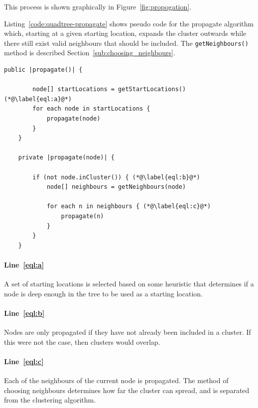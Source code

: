 This process is shown graphically in Figure~\ref{fig:propogation}.

Listing~\ref{code:quadtree-propagate} shows pseudo code for the propagate
algorithm which, starting at a given starting location, expands the cluster
outwards while there still exist valid neighbours that should be included. The
\texttt{getNeighbours()} method is described
Section~\ref{sub:choosing_neighbours}.

\begin{center}
\begin{minipage}{\textwidth}
\begin{lstlisting}[caption={[Code for the propagate algorithm.]Code for the
	propagate algorithm which expands an initial starting location to a
	cluster.}, label=code:quadtree-propagate]
	public |propagate()| {

		node[] startLocations = getStartLocations() (*@\label{eql:a}@*)
		for each node in startLocations {
			propagate(node)
		}
	}

	private |propagate(node)| {

		if (not node.inCluster()) { (*@\label{eql:b}@*)
			node[] neighbours = getNeighbours(node)

			for each n in neighbours { (*@\label{eql:c}@*)
				propagate(n)
			}
		}
	}
\end{lstlisting}
\end{minipage}
\end{center}

\paragraph{Line~\ref{eql:a}} A set of starting locations is selected based on
some heuristic that determines if a node is deep enough in the tree to be used
as a starting location.

\paragraph{Line~\ref{eql:b}} Nodes are only propagated if they have not already
been included in a cluster. If this were not the case, then clusters would
overlap.

\paragraph{Line~\ref{eql:c}} Each of the neighbours of the current node is
propagated. The method of choosing neighbours determines how far the cluster
can spread, and is separated from the clustering algorithm.

